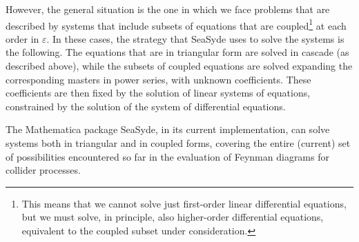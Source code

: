 \documentclass[final,1p,times]{elsarticle}
\begin{document}


However, the general situation is the one in which we face problems that are described by systems that include subsets of equations that are coupled\footnote{This means that we cannot solve just first-order linear differential equations, but we must solve, in principle, also higher-order differential equations, equivalent to the coupled subset under consideration.} at each order in $\varepsilon$. In these cases, the strategy that {\sc SeaSyde} uses to solve the systems is the following. The equations that are in triangular form are solved in cascade (as described above), while the subsets of coupled equations are solved expanding the corresponding masters in power series, with unknown coefficients. These coefficients are then fixed by the solution of linear systems of equations, constrained by the solution of the system of differential equations.

The {\sc Mathematica} package {\sc SeaSyde}, in its current implementation, can solve systems both in triangular and in coupled forms, covering the entire (current) set of possibilities encountered so far in the evaluation of Feynman diagrams for collider processes.


\end{document}
